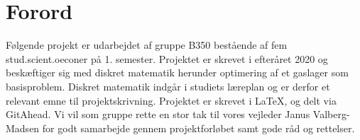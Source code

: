 \chapter{Forord}
Følgende projekt er udarbejdet af gruppe B350 bestående af fem stud.scient.oeconer på 1. semester. Projektet er skrevet i efteråret 2020 og beskæftiger sig med diskret matematik herunder optimering af et gaslager som basisproblem. Diskret matematik indgår i studiets læreplan og er derfor et relevant emne til projektskrivning. Projektet er skrevet i \LaTeX, og delt via GitAhead.
Vi vil som gruppe rette en stor tak til vores vejleder Janus Valberg-Madsen for godt samarbejde gennem projektforløbet samt gode råd og rettelser.